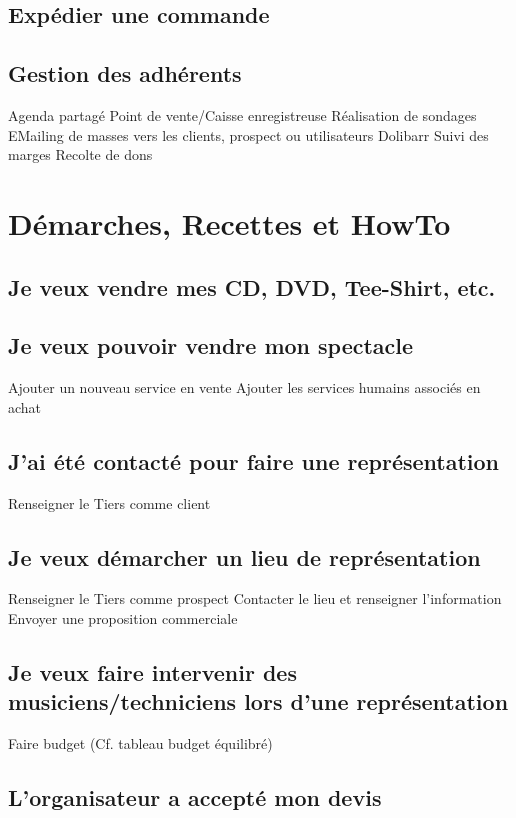 \documentclass[a4paper]{article}
\begin{document}
\subsection{Expédier une commande}
\label{sec:DolibarrExpedierCommande}

\subsection{Gestion des adhérents}
\label{sec:DolibarrGestionAdherents}

Agenda partagé
Point de vente/Caisse enregistreuse
Réalisation de sondages
EMailing de masses vers les clients, prospect ou utilisateurs Dolibarr
Suivi des marges
Recolte de dons 


\section{Démarches, Recettes et HowTo}
\label{sec:HowTo}

\subsection{Je veux vendre mes CD, DVD, Tee-Shirt, etc.}
\label{sec:HowToVendreMerchandising}

\subsection{Je veux pouvoir vendre mon spectacle}
\label{sec:HowToVendreSpectacle}
Ajouter un nouveau service en vente
Ajouter les services humains associés en achat

\subsection{J'ai été contacté pour faire une représentation}
\label{sec:HowToFaireRepresentation}
Renseigner le Tiers comme client

\subsection{Je veux démarcher un lieu de représentation}
\label{sec:HowToDemarcherUnLieu}
Renseigner le Tiers comme prospect
Contacter le lieu et renseigner l'information
Envoyer une proposition commerciale

\subsection{Je veux faire intervenir des musiciens/techniciens lors d'une représentation}
\label{sec:HowToInterventionFournisseur}
Faire budget (Cf. tableau budget équilibré)


\subsection{L'organisateur a accepté mon devis}
\label{sec:HowToAcceptationDevis}



\newpage \printbibheading
\printbibliography[nottype=online,check=notonline,heading=subbibliography,title={Bibliographiques}]
\printbibliography[check=online,heading=subbibliography,title={Webographiques}]
\nocite{*}
\end{document}
